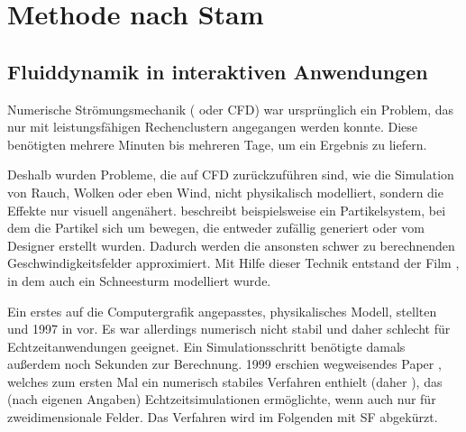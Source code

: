 \section{Methode nach Stam}
\label{sec:stam}

\subsection{Fluiddynamik in interaktiven Anwendungen}

Numerische Strömungsmechanik (\Pimiddyengl {} oder CFD) war ursprünglich ein Problem, das nur mit
leistungsfähigen Rechenclustern angegangen werden konnte. Diese
benötigten mehrere Minuten bis mehreren Tage, um ein Ergebnis zu
liefern.

Deshalb wurden Probleme, die auf CFD zurückzuführen sind, wie die
Simulation von Rauch, Wolken oder eben Wind, nicht physikalisch
modelliert, sondern die Effekte nur visuell
angenähert. \cite{Sims:1990:PAR:97880.97923} beschreibt beispielsweise
ein Partikelsystem, bei dem die Partikel sich um
 bewegen, die entweder zufällig generiert
oder vom Designer erstellt wurden. Dadurch werden die ansonsten schwer
zu berechnenden Geschwindigkeitsfelder approximiert. Mit Hilfe dieser
Technik entstand der Film \cite{ParticleDreams}, in dem auch ein Schneesturm modelliert
wurde.

Ein erstes auf die Computergrafik angepasstes, physikalisches Modell,
stellten  und  1997 in \cite{Foster1997} vor. Es war
allerdings numerisch nicht stabil und daher schlecht für
Echtzeitanwendungen geeignet. Ein Simulationsschritt benötigte damals
außerdem noch  Sekunden zur Berechnung. 1999 erschien 
wegweisendes Paper \cite{Stam1999},
welches zum ersten Mal ein numerisch stabiles Verfahren enthielt
(daher ), das (nach eigenen Angaben)
Echtzeitsimulationen ermöglichte, wenn auch nur für zweidimensionale
Felder. Das Verfahren wird im Folgenden mit SF abgekürzt.

